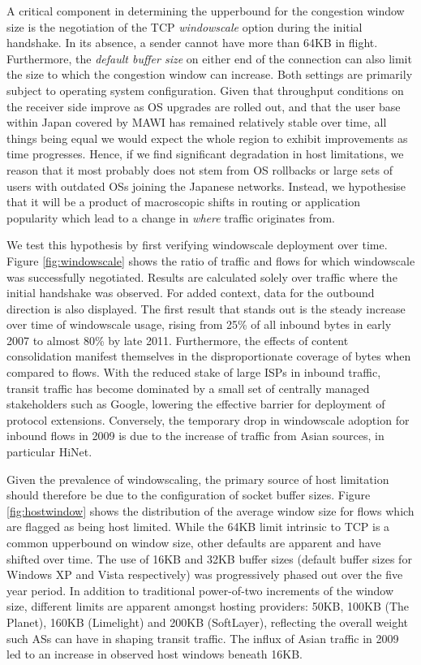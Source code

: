A critical component in determining the upperbound for the congestion window size is the negotiation of the \ac{TCP} \emph{windowscale} option during the initial handshake. 
In its absence, a sender cannot have more than 64KB in flight.
Furthermore, the \emph{default buffer size} on either end of the connection can also limit the size to which the congestion window can increase.
Both settings are primarily subject to operating system configuration.
Given that throughput conditions on the receiver side improve as \acs{OS} upgrades are rolled out, and that the user base within Japan covered by \acs{MAWI} has remained relatively stable over time, all things being equal we would expect the whole region to exhibit improvements as time progresses. 
Hence, if we find significant degradation in host limitations, we reason that it most probably does not stem from \acs{OS} rollbacks or large sets of users with outdated \acp{OS} joining the Japanese networks. 
Instead, we hypothesise that it will be a product of macroscopic shifts in routing or application popularity which lead to a change in \emph{where} traffic originates from.

We test this hypothesis by first verifying windowscale deployment over time.
Figure \ref{fig:windowscale} shows the ratio of traffic and flows for which windowscale was successfully negotiated.
Results are calculated solely over traffic where the initial handshake was observed.
For added context, data for the outbound direction is also displayed.
The first result that stands out is the steady increase over time of windowscale usage, rising from 25\% of all inbound bytes in early 2007 to almost 80\% by late 2011.
Furthermore, the effects of content consolidation manifest themselves in the disproportionate coverage of bytes when compared to flows.
With the reduced stake of large \acp{ISP} in inbound traffic, transit traffic has become dominated by a small set of centrally managed stakeholders such as Google, lowering the effective barrier for deployment of protocol extensions.
Conversely, the temporary drop in windowscale adoption for inbound flows in 2009 is due to the increase of traffic from Asian sources, in particular HiNet.

Given the prevalence of windowscaling, the primary source of host limitation should therefore be due to the configuration of socket buffer sizes.
Figure \ref{fig:hostwindow} shows the distribution of the average window size for flows which are flagged as being host limited.
While the 64KB limit intrinsic to \ac{TCP} is a common upperbound on window size, other defaults are apparent and have shifted over time.
The use of 16KB and 32KB buffer sizes (default buffer sizes for Windows XP and Vista respectively) was progressively phased out over the five year period.
In addition to traditional power-of-two increments of the window size, different limits are apparent amongst hosting providers: 50KB, 100KB (The Planet), 160KB (Limelight) and 200KB (SoftLayer), reflecting the overall weight such \acp{AS} can have in shaping transit traffic.
The influx of Asian traffic in 2009 led to an increase in observed host windows beneath 16KB.

